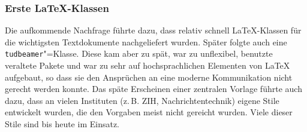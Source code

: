 \begin{frame}[allowframebreaks]\frametitle{Erste \LaTeX{}-Klassen}
  Die aufkommende Nachfrage führte dazu, dass relativ schnell
  \LaTeX-Klassen für die wichtigsten Textdokumente nachgeliefert
  wurden. Später folgte auch eine \texttt{tudbeamer}"=Klasse. Diese
  kam aber zu spät, war zu unflexibel, benutzte veraltete Pakete und
  war zu sehr auf hochsprachlichen Elementen von \LaTeX{} aufgebaut,
  so dass sie den Ansprüchen an eine moderne Kommunikation nicht
  gerecht werden konnte. Das späte Erscheinen einer zentralen Vorlage
  führte auch dazu, dass an vielen Instituten (z.\,B. ZIH,
  Nachrichtentechnik) eigene Stile entwickelt wurden, die den Vorgaben
  meist nicht gereicht wurden. Viele dieser Stile sind bis heute im
  Einsatz.
\end{frame}

